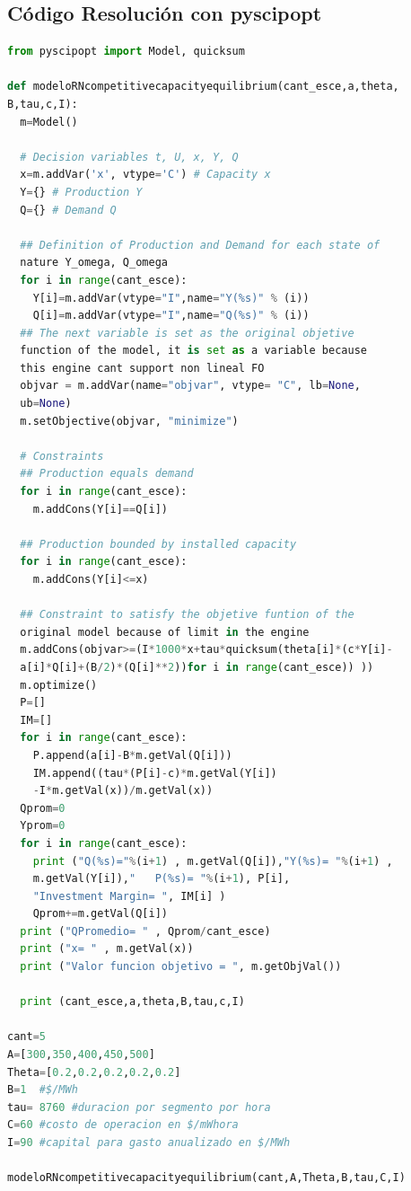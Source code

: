 \subsection{Código Resolución con pyscipopt}\label{codigopysipopt}
\begin{footnotesize}
\begin{lstlisting}[language=Python]
from pyscipopt import Model, quicksum

def modeloRNcompetitivecapacityequilibrium(cant_esce,a,theta,
B,tau,c,I):
  m=Model()
  
  # Decision variables t, U, x, Y, Q
  x=m.addVar('x', vtype='C') # Capacity x
  Y={} # Production Y
  Q={} # Demand Q
  
  ## Definition of Production and Demand for each state of
  nature Y_omega, Q_omega
  for i in range(cant_esce):
    Y[i]=m.addVar(vtype="I",name="Y(%s)" % (i))
    Q[i]=m.addVar(vtype="I",name="Q(%s)" % (i))
  ## The next variable is set as the original objetive
  function of the model, it is set as a variable because
  this engine cant support non lineal FO
  objvar = m.addVar(name="objvar", vtype= "C", lb=None,
  ub=None)
  m.setObjective(objvar, "minimize")
  
  # Constraints
  ## Production equals demand    
  for i in range(cant_esce):
    m.addCons(Y[i]==Q[i])
  
  ## Production bounded by installed capacity  
  for i in range(cant_esce):
    m.addCons(Y[i]<=x)  
  
  ## Constraint to satisfy the objetive funtion of the
  original model because of limit in the engine   
  m.addCons(objvar>=(I*1000*x+tau*quicksum(theta[i]*(c*Y[i]-
  a[i]*Q[i]+(B/2)*(Q[i]**2))for i in range(cant_esce)) ))
  m.optimize()
  P=[]
  IM=[]
  for i in range(cant_esce):
    P.append(a[i]-B*m.getVal(Q[i]))
    IM.append((tau*(P[i]-c)*m.getVal(Y[i])
    -I*m.getVal(x))/m.getVal(x))
  Qprom=0
  Yprom=0
  for i in range(cant_esce):
    print ("Q(%s)="%(i+1) , m.getVal(Q[i]),"Y(%s)= "%(i+1) ,
    m.getVal(Y[i]),"   P(%s)= "%(i+1), P[i],
    "Investment Margin= ", IM[i] )
    Qprom+=m.getVal(Q[i])
  print ("QPromedio= " , Qprom/cant_esce)
  print ("x= " , m.getVal(x))
  print ("Valor funcion objetivo = ", m.getObjVal())

  print (cant_esce,a,theta,B,tau,c,I)

cant=5
A=[300,350,400,450,500]
Theta=[0.2,0.2,0.2,0.2,0.2]
B=1  #$/MWh
tau= 8760 #duracion por segmento por hora
C=60 #costo de operacion en $/mWhora
I=90 #capital para gasto anualizado en $/MWh

modeloRNcompetitivecapacityequilibrium(cant,A,Theta,B,tau,C,I) 
\end{lstlisting}
\end{footnotesize}

